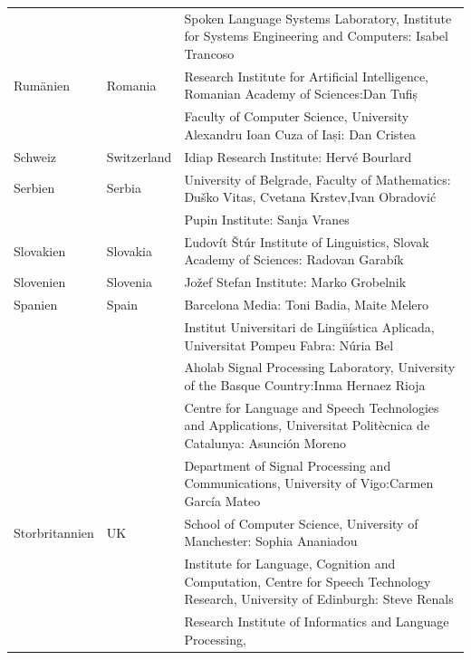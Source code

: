 \begin{longtable}{llp{113mm}}
  & & Spoken Language Systems Laboratory, Institute for Systems Engineering and Computers: Isabel Trancoso \\ \addlinespace
  Rumänien & \textcolor{grey1}{Romania} & Research Institute for Artificial Intelligence, Romanian Academy of Sciences:\newline Dan Tufiș \\ \addlinespace
  & & Faculty of Computer Science, University Alexandru Ioan Cuza of
  Iași: Dan Cristea \\ \addlinespace
  Schweiz & \textcolor{grey1}{Switzerland} & Idiap Research Institute: Hervé Bourlard \\ \addlinespace 
  Serbien & \textcolor{grey1}{Serbia} & University of Belgrade, Faculty of Mathematics: Duško Vitas, Cvetana Krstev,\newline Ivan Obradović \\ \addlinespace
  & & Pupin Institute: Sanja Vranes \\ \addlinespace  
  Slovakien & \textcolor{grey1}{Slovakia} & Ľudovít Štúr Institute of Linguistics, Slovak Academy of Sciences: Radovan Garabík \\ \addlinespace 
  Slovenien & \textcolor{grey1}{Slovenia} & Jožef Stefan Institute: Marko Grobelnik \\ \addlinespace 
  Spanien & \textcolor{grey1}{Spain} & Barcelona Media: Toni Badia, Maite Melero \\ \addlinespace 
  & & Institut Universitari de Lingüística Aplicada, Universitat Pompeu Fabra: Núria Bel \\ \addlinespace 
  & & Aholab Signal Processing Laboratory, University of the Basque Country:\newline Inma Hernaez Rioja \\ \addlinespace 
  & & Centre for Language and Speech Technologies and Applications, Universitat Politècnica de Catalunya:  Asunción Moreno \\ \addlinespace 
  & & Department of Signal Processing and Communications, University
  of Vigo:\newline Carmen García Mateo \\ \addlinespace 
  Storbritannien & \textcolor{grey1}{UK} & 
  School of Computer Science, University of Manchester: Sophia Ananiadou \\ \addlinespace 
  & & Institute for Language, Cognition and Computation, Centre for Speech Technology Research, University of Edinburgh: Steve Renals \\ \addlinespace 
  & & Research Institute of Informatics and Language Processing,

\end{longtable}
